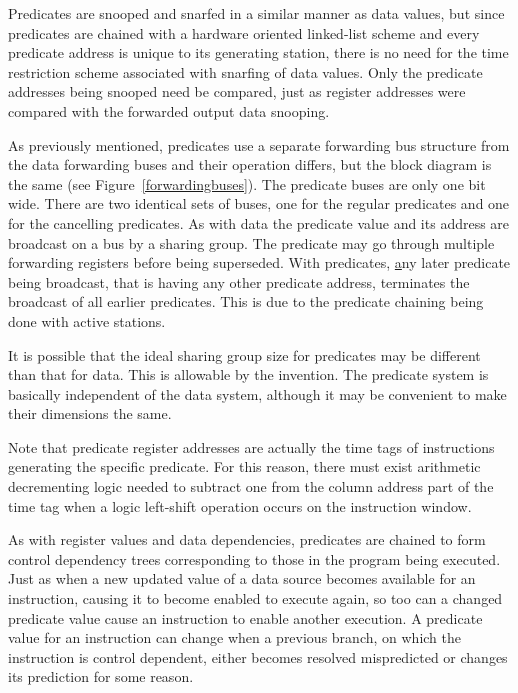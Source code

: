 \documentclass[10pt,dvips]{article}
\begin{document}
Predicates are snooped and snarfed in a similar manner as data values,
but since predicates are chained with a hardware oriented linked-list
scheme and every predicate address is unique to its generating station,
there is no need for the time restriction scheme associated
with snarfing of data values.  Only the predicate addresses being
snooped need be compared, just as register addresses were compared with the
forwarded output data snooping.

As previously mentioned, predicates use a separate forwarding bus
structure from the data forwarding buses and their operation differs,
but the block diagram is the same (see Figure~\ref{forwardingbuses}).
The predicate buses are only one bit wide. There are two identical
sets of buses, one
for the regular predicates and one for the cancelling predicates.
As with data the predicate value and its address are broadcast on a bus
by a sharing group. The predicate may go through multiple forwarding
registers before being superseded. With predicates, {\underline any}
later predicate being broadcast, that is having any other predicate
address, terminates the broadcast of all earlier predicates. This
is due to the predicate chaining being done with active stations.

It is possible that the ideal sharing group size for predicates may be
different than that for data. This is allowable by the invention.
The predicate system is basically independent of the data system,
although it may be convenient to make their dimensions the same.

Note that predicate register addresses are actually the
time tags of instructions generating the specific predicate.
For this reason, there must exist
arithmetic decrementing logic needed to subtract one from the
column address part of the time tag when a logic left-shift
operation occurs on the instruction window.

As with register values and data dependencies, predicates are chained to
form control dependency trees corresponding to those
in the program being executed.
Just as when a new updated value of a data source becomes
available for an instruction, causing it to become enabled to
execute again, so too can a changed predicate value cause
an instruction to enable another execution.  A predicate
value for an instruction can change when a previous branch,
on which the instruction is control dependent, either becomes
resolved mispredicted or changes its prediction for some reason.
\end{document}
